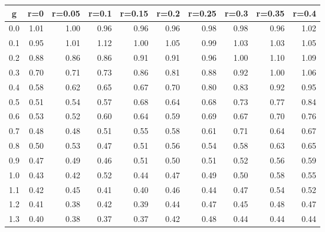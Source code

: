 %
\begin{table}[!tbp]
 \begin{center}
 \begin{tabular}{rrrrrrrrrr}\hline\hline
\multicolumn{1}{c}{g}&\multicolumn{1}{c}{r=0}&\multicolumn{1}{c}{r=0.05}&\multicolumn{1}{c}{r=0.1}&\multicolumn{1}{c}{r=0.15}&\multicolumn{1}{c}{r=0.2}&\multicolumn{1}{c}{r=0.25}&\multicolumn{1}{c}{r=0.3}&\multicolumn{1}{c}{r=0.35}&\multicolumn{1}{c}{r=0.4}\tabularnewline
\hline
0.0&1.01&1.00&0.96&0.96&0.96&0.98&0.98&0.96&1.02\tabularnewline
0.1&0.95&1.01&1.12&1.00&1.05&0.99&1.03&1.03&1.05\tabularnewline
0.2&0.88&0.86&0.86&0.91&0.91&0.96&1.00&1.10&1.09\tabularnewline
0.3&0.70&0.71&0.73&0.86&0.81&0.88&0.92&1.00&1.06\tabularnewline
0.4&0.58&0.62&0.65&0.67&0.70&0.80&0.83&0.92&0.95\tabularnewline
0.5&0.51&0.54&0.57&0.68&0.64&0.68&0.73&0.77&0.84\tabularnewline
0.6&0.53&0.52&0.60&0.64&0.59&0.69&0.67&0.70&0.76\tabularnewline
0.7&0.48&0.48&0.51&0.55&0.58&0.61&0.71&0.64&0.67\tabularnewline
0.8&0.50&0.53&0.47&0.51&0.56&0.54&0.58&0.63&0.65\tabularnewline
0.9&0.47&0.49&0.46&0.51&0.50&0.51&0.52&0.56&0.59\tabularnewline
1.0&0.43&0.42&0.52&0.44&0.47&0.49&0.50&0.58&0.55\tabularnewline
1.1&0.42&0.45&0.41&0.40&0.46&0.44&0.47&0.54&0.52\tabularnewline
1.2&0.41&0.38&0.42&0.39&0.44&0.47&0.45&0.48&0.47\tabularnewline
1.3&0.40&0.38&0.37&0.37&0.42&0.48&0.44&0.44&0.44\tabularnewline
\hline
\end{tabular}

\end{center}

\end{table}

